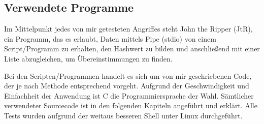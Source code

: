 \documentclass[12pt,a4paper]{scrartcl}
\numberwithin{equation}{section}
\numberwithin{myalgctr}{section}
\numberwithin{mytheoremctr}{section}
\begin{document}
	\subsection{Verwendete Programme}
	Im Mittelpunkt jedes von mir getesteten Angriffes steht John the Ripper (JtR), ein Programm, das es erlaubt, Daten mittels Pipe (stdio) von einem Script/Programm zu erhalten, den Hashwert zu bilden und anschließend mit einer Liste abzugleichen, um Übereinstimmungen zu finden.\\
	\par\noindent
	Bei den Scripten/Programmen handelt es sich um von mir geschriebenen Code, der je nach Methode entsprechend vorgeht. Aufgrund der Geschwindigkeit und Einfachheit der Anwendung ist C die Programmiersprache der Wahl. Sämtlicher verwendeter Sourcecode ist in den folgenden Kapiteln angeführt und erklärt. Alle Tests wurden aufgrund der weitaus besseren Shell unter Linux durchgeführt.
	
	
	\newpage
\end{document}
